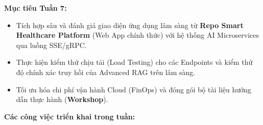 \vspace{0.5em}\noindent\textbf{Mục tiêu Tuần 7:}

\begin{itemize}
\tightlist
\item
  Tích hợp sâu và đánh giá giao diện ứng dụng lâm sàng từ \textbf{Repo
  Smart Healthcare Platform} (Web App chính thức) với hệ thống AI
  Microservices qua luồng SSE/gRPC.
\item
  Thực hiện kiểm thử chịu tải (Load Testing) cho các Endpoints và kiểm
  thử độ chính xác truy hồi của Advanced RAG trên lâm sàng.
\item
  Tối ưu hóa chi phí vận hành Cloud (FinOps) và đóng gói bộ tài liệu
  hướng dẫn thực hành (\textbf{Workshop}).
\end{itemize}

\vspace{0.5em}\noindent\textbf{Các công việc triển khai trong tuần:}

